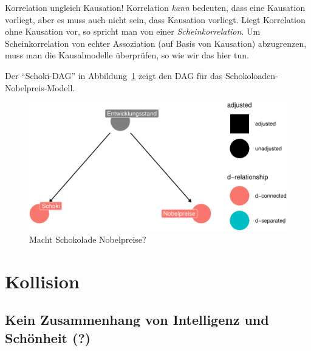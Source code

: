 \documentclass[
  a4paper,
  DIV=11]{scrreprt}
\theoremstyle{definition}
\theoremstyle{remark}
\begin{document}
\begin{tcolorbox}[enhanced jigsaw, leftrule=.75mm, toptitle=1mm, bottomtitle=1mm, titlerule=0mm, breakable, colframe=quarto-callout-important-color-frame, title=\textcolor{quarto-callout-important-color}{\faExclamation}\hspace{0.5em}{Wichtig}, rightrule=.15mm, colback=white, arc=.35mm, left=2mm, bottomrule=.15mm, coltitle=black, opacitybacktitle=0.6, toprule=.15mm, colbacktitle=quarto-callout-important-color!10!white, opacityback=0]
Korrelation ungleich Kausation! Korrelation \emph{kann} bedeuten, dass
eine Kausation vorliegt, aber es muss auch nicht sein, dass Kausation
vorliegt. Liegt Korrelation ohne Kausation vor, so spricht man von einer
\emph{Scheinkorrelation}. Um Scheinkorrelation von echter Assoziation
(auf Basis von Kausation) abzugrenzen, muss man die Kausalmodelle
überprüfen, so wie wir das hier tun.
\end{tcolorbox}

Der ``Schoki-DAG'' in Abbildung~\ref{fig-schoki-dag} zeigt den DAG für
das Schokoloaden-Nobelpreis-Modell.

\begin{figure}

{\centering \includegraphics{./kausal_files/figure-pdf/fig-schoki-dag-1.pdf}

}

\caption{\label{fig-schoki-dag}Macht Schokolade Nobelpreise?}

\end{figure}

\hypertarget{kollision}{%
\section{Kollision}\label{kollision}}

\hypertarget{kein-zusammenhang-von-intelligenz-und-schuxf6nheit}{%
\subsection{Kein Zusammenhang von Intelligenz und Schönheit
(?)}\label{kein-zusammenhang-von-intelligenz-und-schuxf6nheit}}
\end{document}
